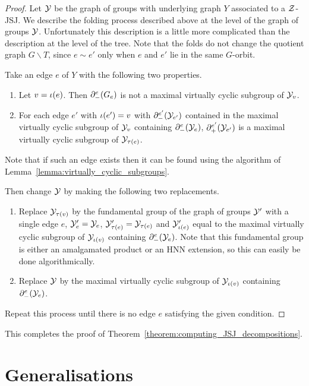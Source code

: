 \begin{proof} 
  Let $\mathcal{Y}$ be the graph of groups with underlying graph $Y$ associated to a $\mathcal{Z}$-JSJ.
  We describe the folding process described above at the level of the graph of groups $\mathcal{Y}$.
  Unfortunately this description is a little more complicated than the description at the level of the tree.
  Note that the folds do not change the quotient graph $G \backslash T$, since $e \sim e'$ only when $e$ and $e'$ lie in the same $G$-orbit.

  Take an edge $e$ of $Y$ with the following two properties.
  \begin{enumerate}
    \item Let $v = \operatorname{\iota}(e)$. Then $\partial^e_{-}(G_e)$ is not a maximal virtually cyclic subgroup of $\mathcal{Y}_v$.
    \item For each edge $e'$ with $\operatorname{\iota}(e') = v$ with $\partial^{e'}_{-}(\mathcal{Y}_{e'})$ contained in the maximal virtually cyclic subgroup of $\mathcal{Y}_v$ containing $\partial^e_{-}(\mathcal{Y}_e)$, $\partial^{e'}_{+}(\mathcal{Y}_{e'})$ is a maximal virtually cyclic subgroup of $\mathcal{Y}_{\operatorname{\tau}(e)}$.
  \end{enumerate}
  Note that if such an edge exists then it can be found using the algorithm of Lemma~\ref{lemma:virtually_cyclic_subgroups}.

  Then change $\mathcal{Y}$ by making the following two replacements.
  \begin{enumerate}
    \item Replace $\mathcal{Y}_{\operatorname{\tau}(v)}$ by the fundamental group of the graph of groups $\mathcal{Y}'$ with a single edge $e$, $\mathcal{Y}'_e = \mathcal{Y}_e$, $\mathcal{Y}'_{\operatorname{\tau}(e)} = \mathcal{Y}_{\operatorname{\tau}(e)}$ and $\mathcal{Y}'_{\operatorname{\iota}(e)}$ equal to the maximal virtually cyclic subgroup of $\mathcal{Y}_{\operatorname{\iota}(v)}$ containing $\partial^e_{-}(\mathcal{Y}_e)$. 
      Note that this fundamental group is either an amalgamated product or an HNN extension, so this can easily be done algorithmically.
    \item Replace $\mathcal{Y}$ by the maximal virtually cyclic subgroup of $\mathcal{Y}_{\operatorname{\iota}(v)}$ containing $\partial^e_{-}(\mathcal{Y}_e)$.
  \end{enumerate}

  Repeat this process until there is no edge $e$ satisfying the given condition.
\end{proof}

This completes the proof of Theorem~\ref{theorem:computing_JSJ_decompositions}.

\section{Generalisations}

